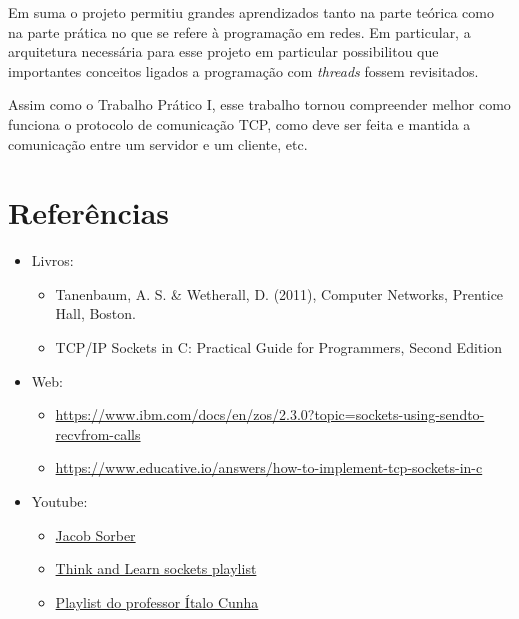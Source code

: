 \documentclass{article}
\begin{document}
Em suma o projeto permitiu grandes aprendizados tanto na parte teórica como na
parte prática no que se refere à programação em redes. Em particular, a
arquitetura necessária para esse projeto em particular possibilitou que
importantes conceitos ligados a programação com \textit{threads} fossem
revisitados.

Assim como o Trabalho Prático I, esse trabalho tornou compreender melhor como
funciona o protocolo de comunicação TCP, como
deve ser feita e mantida a comunicação entre um servidor e um cliente, etc.

\section{Referências}

\begin{itemize}
      \item Livros:
            \begin{itemize}
                  \item Tanenbaum, A. S. \& Wetherall, D. (2011), Computer
                        Networks, Prentice Hall, Boston.
                  \item TCP/IP Sockets in C\@: Practical Guide for Programmers,
                        Second Edition
            \end{itemize}

      \item Web:
            \begin{itemize}
                  \item

                        \url{https://www.ibm.com/docs/en/zos/2.3.0?topic=sockets-using-sendto-recvfrom-calls}
                  \item

                        \url{https://www.educative.io/answers/how-to-implement-tcp-sockets-in-c}

            \end{itemize}

      \item Youtube:
            \begin{itemize}
                  \item \href{https://www.youtube.com/@JacobSorber}{Jacob
                              Sorber}
                  \item

                        \href{https://www.youtube.com/watch?v=_lQ-3S4fJ0U&list=PLPyaR5G9aNDvs6TtdpLcVO43_jvxp4emI}{Think
                              and Learn sockets playlist}
                  \item

                        \href{https://www.youtube.com/watch?v=tJ3qNtv0HVs&t=2s}{Playlist do professor
                              Ítalo Cunha}
            \end{itemize}

\end{itemize}
\end{document}
